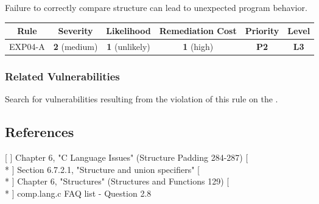    Failure to correctly compare structure can lead to unexpected program behavior.

   \begin{tabular}[c]{| c| c| c| c| c| c|}
   \hline
   {\bf Rule} & {\bf Severity} & {\bf Likelihood} & {\bf Remediation Cost} & {\bf Priority} & {\bf Level} \\ \hline
   EXP04-A & {\bf 2} (medium) & {\bf 1} (unlikely) & {\bf 1} (high) & {\bf P2} & {\bf L3} \\ \hline
   \end{tabular}
   \subsubsection{Related Vulnerabilities}

   Search for vulnerabilities resulting from the violation of this rule on the  .
   \subsection{References}

   [  ] Chapter 6, "C Language Issues" (Structure Padding 284-287) [ \\*
    ] Section 6.7.2.1, "Structure and union specifiers" [ \\*
    ] Chapter 6, "Structures" (Structures and Functions 129) [ \\*
    ] comp.lang.c FAQ list - Question 2.8
